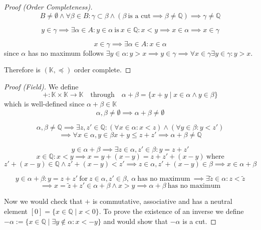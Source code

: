\documentclass[english,titlepage]{uzhpub}
\theoremstyle{definition}
\theoremstyle{plain}
\theoremstyle{remark}
\theoremstyle{example}
\begin{document}
\begin{proof}[Proof (Order Completeness)]
      \[B \neq \emptyset \land \forall \beta \in B: \gamma \subset \beta \land (\beta~\text{is a cut} \implies \beta \neq \mathbb{Q}) \implies \gamma \neq \mathbb{Q}\]

      \[y \in \gamma \implies \exists \alpha \in A: y \in \alpha~\text{is}~x \in \mathbb{Q}: x < y \implies x \in \alpha \implies x \in \gamma\]

      \[x \in \gamma \implies \exists \alpha \in A: x \in \alpha\]
      since \(\alpha\) has no maximum follows \(\exists y \in \alpha: y > x \implies y \in \gamma \implies \forall x \in \gamma \exists y \in \gamma: y > x\).

      Therefore is \((\mathbb{K}, \preceq)\) order complete.
   \end{proof}
   \begin{proof}[Proof (Field)]
      We define
      \[+: \mathbb{K} \times \mathbb{K} \to \mathbb{K} \quad\text{through}\quad \alpha + \beta = \{x + y \mid x \in \alpha \land y \in \beta\}\]
      which is well-defined since \(\alpha + \beta \in \mathbb{K}\)
      \[\alpha, \beta \neq \emptyset \implies \alpha + \beta \neq \emptyset\]

      \[\alpha, \beta \neq \mathbb{Q} \implies \exists z, z' \in \mathbb{Q}: (\forall x \in \alpha: x < z) \land (\forall y \in \beta: y < z')\]
      \[\implies \forall x \in \alpha, y \in \beta x + y \leq z + z' \implies \alpha + \beta \neq \mathbb{Q}\]

      \[y \in \alpha + \beta \implies \exists z \in \alpha, z' \in \beta: y = z + z'\]
      \[x \in \mathbb{Q}: x < y \implies x = y + (x - y) = z + z' + (x -y)~\text{where}\]
      \[z' + (x -y) \in \mathbb{Q} \land z' + (x - y) < z' \implies z \in \alpha, z' + (x -y) \in \beta \implies x \in \alpha + \beta\]

      \[y \in \alpha + \beta: y = z + z'~\text{for}~z \in \alpha, z' \in \beta,~\alpha~\text{has no maximum}~\implies \exists \widetilde{z} \in \alpha: z < \tilde{z}\]
      \[\implies x = \widetilde{z} + z' \in \alpha + \beta \land x > y \implies \alpha + \beta~\text{has no maximum}\]

      Now we would check that \(+\) is commutative, associative and has a neutral element \([0] = \{x \in \mathbb{Q} \mid x < 0\}\).
      To prove the existence of an inverse we define \(-\alpha := \{x \in \mathbb{Q} \mid \exists y \not\in \alpha: x < -y\}\) and would show that \(-\alpha\) is a cut.


\end{proof}
\end{document}
